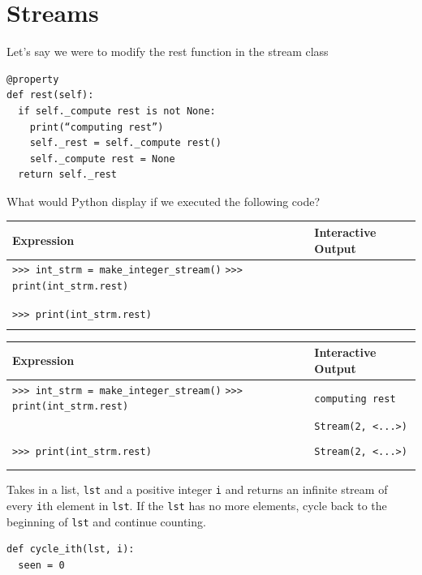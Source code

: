 \documentclass{exam}
\begin{document}
\section{Streams}
\begin{questions}
\item Let's say we were to modify the rest function in the stream class
\begin{lstlisting}
@property 
def rest(self):
  if self._compute rest is not None: 
    print(“computing rest”)
    self._rest = self._compute rest() 
    self._compute rest = None 
  return self._rest
\end{lstlisting}

What would Python display if we executed the following code?
\begin{center}
    \begin{tabular}{|m{9.2cm}|m{6cm}|}
\hline
\textbf{Expression} & \textbf{Interactive Output} \\
\hline
\lstinline$>>> int_strm = make_integer_stream()$
 \lstinline$>>> print(int_strm.rest)$ & \\
 & \\ & \\
\hline
\lstinline$>>> print(int_strm.rest)$ & \\ & \\
\hline
\end{tabular}
\end{center}

\begin{solution}
\begin{center}
    \begin{tabular}{|m{9cm}|m{5cm}|}
\hline
\textbf{Expression} & \textbf{Interactive Output} \\
\hline
\lstinline$>>> int_strm = make_integer_stream()$
 \lstinline$>>> print(int_strm.rest)$ & \color{red}\lstinline$computing rest$ \\
 & \color{red}\lstinline$Stream(2, <...>)$ \\ & \\
\hline
\lstinline$>>> print(int_strm.rest)$ & \color{red}\lstinline$Stream(2, <...>)$ \\ & \\ & \\
\hline
\end{tabular}
\end{center}
\end{solution}

\item Takes in a list, \texttt{lst} and a positive integer \texttt{i} and returns an infinite stream of every \texttt{i}th element in \texttt{lst}. If the \texttt{lst} has no more elements, cycle back to the beginning of \texttt{lst} and continue counting. 
\begin{lstlisting}
def cycle_ith(lst, i):
  seen = 0


\end{lstlisting}
\end{questions}
\end{document}
